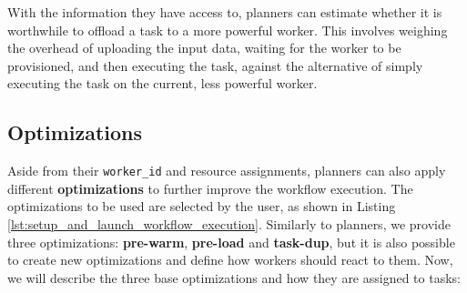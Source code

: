 With the information they have access to, planners can estimate whether it is worthwhile to offload a task to a more powerful worker. This involves weighing the overhead of uploading the input data, waiting for the worker to be provisioned, and then executing the task, against the alternative of simply executing the task on the current, less powerful worker.

\subsection{Optimizations}

Aside from their \texttt{worker\_id} and resource assignments, planners can also apply different \textbf{optimizations} to further improve the workflow execution. The optimizations to be used are selected by the user, as shown in Listing \ref{lst:setup_and_launch_workflow_execution}. Similarly to planners, we provide three optimizations: \textbf{pre-warm}, \textbf{pre-load} and \textbf{task-dup}, but it is also possible to create new optimizations and define how workers should react to them. Now, we will describe the three base optimizations and how they are assigned to tasks:

